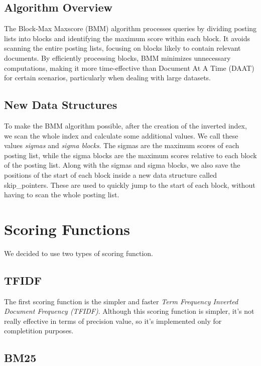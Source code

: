 \subsection{Algorithm Overview}

The Block-Max Maxscore (BMM) algorithm processes queries by dividing posting lists into blocks and identifying the maximum score 
within each block. It avoids scanning the entire posting lists, focusing on blocks likely to contain relevant documents. 
By efficiently processing blocks, BMM minimizes unnecessary computations, making it more time-effective than 
Document At A Time (DAAT) for certain scenarios, particularly when dealing with large datasets.

\subsection{New Data Structures}

To make the BMM algorithm possible, after the creation of the inverted index, we scan the whole index and calculate some additional values.
We call these values \textit{sigmas} and \textit{sigma blocks}. The sigmas are the maximum scores of each posting list, 
while the sigma blocks are the maximum scores relative to each block of the posting list.
Along with the sigmas and sigma blocks, we also save the positions of the start of each block inside a new data structure called skip\_pointers.
These are used to quickly jump to the start of each block, without having to scan the whole posting list. 

\section{Scoring Functions}

We decided to use two types of scoring function.

\subsection{TFIDF}

The first scoring function is the simpler and faster \textit{Term Frequency Inverted Document Frequency (TFIDF)}.
Although this scoring function is simpler, it's not really effective in terms of precision value, so it's implemented only for completition
purposes.

\subsection{BM25}

